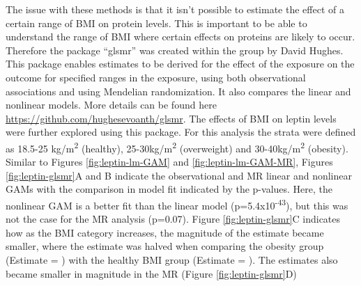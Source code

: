 \documentclass[11pt,twoside]{bristolthesis}
\begin{document}
The issue with these methods is that it isn't possible to estimate the effect of a certain range of BMI on protein levels. This is important to be able to understand the range of BMI where certain effects on proteins are likely to occur. Therefore the package ``glsmr'' was created within the group by David Hughes. This package enables estimates to be derived for the effect of the exposure on the outcome for specified ranges in the exposure, using both observational associations and using Mendelian randomization. It also compares the linear and nonlinear models. More details can be found here \url{https://github.com/hughesevoanth/glsmr}. The effects of BMI on leptin levels were further explored using this package. For this analysis the strata were defined as 18.5-25 kg/m\textsuperscript{2} (healthy), 25-30kg/m\textsuperscript{2} (overweight) and 30-40kg/m\textsuperscript{2} (obesity). Similar to Figures \ref{fig:leptin-lm-GAM} and \ref{fig:leptin-lm-GAM-MR}, Figures \ref{fig:leptin-glsmr}A and B indicate the observational and MR linear and nonlinear GAMs with the comparison in model fit indicated by the p-values. Here, the nonlinear GAM is a better fit than the linear model (p=5.4x10\textsuperscript{-43}), but this was not the case for the MR analysis (p=0.07). Figure \ref{fig:leptin-glsmr}C indicates how as the BMI category increases, the magnitude of the estimate became smaller, where the estimate was halved when comparing the obesity group (Estimate = ) with the healthy BMI group (Estimate = ). The estimates also became smaller in magnitude in the MR (Figure \ref{fig:leptin-glsmr}D)
\end{document}
